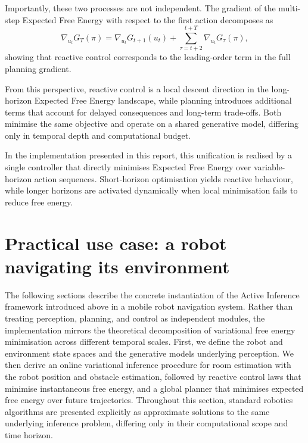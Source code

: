 \documentclass[a4paper, twoside]{article}
\begin{document}
Importantly, these two processes are not independent. The gradient of the multi-step
Expected Free Energy with respect to the first action decomposes as
\begin{equation}
\nabla_{u_t} G_T(\pi)
=
\nabla_{u_t} G_{t+1}(u_t)
+
\sum_{\tau=t+2}^{t+T} \nabla_{u_t} G_\tau(\pi),
\end{equation}
showing that reactive control corresponds to the leading-order term in the full
planning gradient.

From this perspective, reactive control is a local descent direction in the
long-horizon Expected Free Energy landscape, while planning introduces additional
terms that account for delayed consequences and long-term trade-offs. Both minimise
the same objective and operate on a shared generative model, differing only in
temporal depth and computational budget.

In the implementation presented in this report, this unification is realised by a
single controller that directly minimises Expected Free Energy over variable-horizon
action sequences. Short-horizon optimisation yields reactive behaviour, while longer
horizons are activated dynamically when local minimisation fails to reduce free
energy.




\section{Practical use case: a robot navigating its environment}

The following sections describe the concrete instantiation of the Active Inference framework introduced above in a mobile robot navigation system. Rather than treating perception, planning, and control as independent modules, the implementation mirrors the theoretical decomposition of variational free energy minimisation across different temporal scales. First, we define the robot and environment state spaces and the generative models underlying perception. We then derive an online variational inference procedure for room estimation with the robot position and obstacle estimation, followed by reactive control laws that minimise instantaneous free energy, and a global planner that minimises expected free energy over future trajectories. Throughout this section, standard robotics algorithms are presented explicitly as approximate solutions to the same underlying inference problem, differing only in their computational scope and time horizon.
\end{document}
